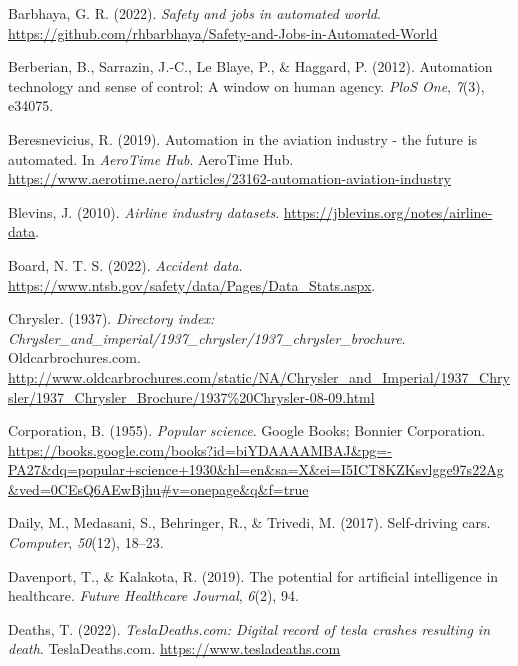 \documentclass[
  man,floatsintext]{apa7}
\newlength{\cslhangindent}
\newlength{\cslentryspacingunit} %
\newenvironment{CSLReferences}[2] %
 {%
  \setlength{\parindent}{0pt}
  \ifodd #1
  \let\oldpar\par
  \def\par{\hangindent=\cslhangindent\oldpar}
  \fi
  \setlength{\parskip}{#2\cslentryspacingunit}
 }%
 {}
\begin{document}
\begin{CSLReferences}{1}{0}
\leavevmode{}%
Barbhaya, G. R. (2022). \emph{Safety and jobs in automated world}. \url{https://github.com/rhbarbhaya/Safety-and-Jobs-in-Automated-World}

\leavevmode{}%
Berberian, B., Sarrazin, J.-C., Le Blaye, P., \& Haggard, P. (2012). Automation technology and sense of control: A window on human agency. \emph{PloS One}, \emph{7}(3), e34075.

\leavevmode{}%
Beresnevicius, R. (2019). Automation in the aviation industry - the future is automated. In \emph{AeroTime Hub}. AeroTime Hub. \url{https://www.aerotime.aero/articles/23162-automation-aviation-industry}

\leavevmode{}%
Blevins, J. (2010). \emph{Airline industry datasets}. \url{https://jblevins.org/notes/airline-data}.

\leavevmode{}%
Board, N. T. S. (2022). \emph{Accident data}. \url{https://www.ntsb.gov/safety/data/Pages/Data_Stats.aspx}.

\leavevmode{}%
Chrysler. (1937). \emph{Directory index: Chrysler\_and\_imperial/1937\_chrysler/1937\_chrysler\_brochure}. Oldcarbrochures.com. \url{http://www.oldcarbrochures.com/static/NA/Chrysler_and_Imperial/1937_Chrysler/1937_Chrysler_Brochure/1937\%20Chrysler-08-09.html}

\leavevmode{}%
Corporation, B. (1955). \emph{Popular science}. Google Books; Bonnier Corporation. \url{https://books.google.com/books?id=biYDAAAAMBAJ\&pg=-PA27\&dq=popular+science+1930\&hl=en\&sa=X\&ei=I5ICT8KZKsvlgge97s22Ag\&ved=0CEsQ6AEwBjhu\#v=onepage\&q\&f=true}

\leavevmode{}%
Daily, M., Medasani, S., Behringer, R., \& Trivedi, M. (2017). Self-driving cars. \emph{Computer}, \emph{50}(12), 18--23.

\leavevmode{}%
Davenport, T., \& Kalakota, R. (2019). The potential for artificial intelligence in healthcare. \emph{Future Healthcare Journal}, \emph{6}(2), 94.

\leavevmode{}%
Deaths, T. (2022). \emph{TeslaDeaths.com: Digital record of tesla crashes resulting in death}. TeslaDeaths.com. \url{https://www.tesladeaths.com}


\end{CSLReferences}
\end{document}
